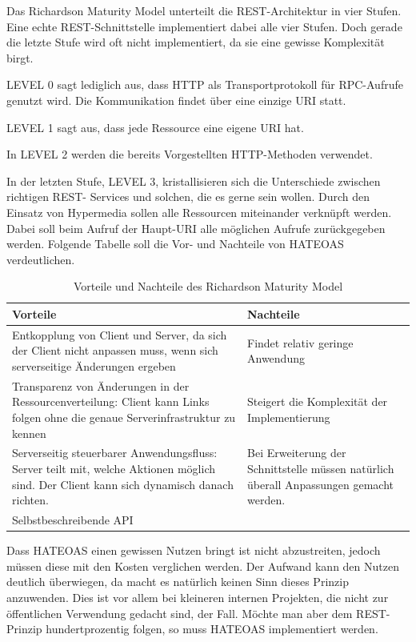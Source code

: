 Das Richardson Maturity Model unterteilt die \ac{REST}-Architektur in vier Stufen. Eine echte
\ac{REST}-Schnittstelle implementiert dabei alle vier Stufen. Doch gerade die letzte Stufe wird oft
nicht implementiert, da sie eine gewisse Komplexität birgt.

LEVEL 0 sagt lediglich aus, dass \ac{HTTP} als Transportprotokoll für RPC-Aufrufe genutzt wird.
Die Kommunikation findet über eine einzige \ac{URI} statt.

LEVEL 1 sagt aus, dass jede Ressource eine eigene \ac{URI} hat.

In LEVEL 2 werden die bereits Vorgestellten \ac{HTTP}-Methoden verwendet.

In der letzten Stufe, LEVEL 3, kristallisieren sich die Unterschiede zwischen richtigen \ac{REST}-
Services und solchen, die es gerne sein wollen. Durch den Einsatz von Hypermedia sollen alle
Ressourcen miteinander verknüpft werden. Dabei soll beim Aufruf der Haupt-\ac{URI} alle
möglichen Aufrufe zurückgegeben werden. Folgende Tabelle soll die Vor- und Nachteile von
HATEOAS verdeutlichen.
\newline

\begin{table}[H]
	\begin{tabular}{ | p{7cm} | p{7cm} | }	
		\hline	
		Vorteile & Nachteile \\  \hline	
		Entkopplung von Client und Server, da sich der Client nicht anpassen muss,
		wenn sich serverseitige Änderungen ergeben & 
		Findet relativ geringe Anwendung	 \\ \hline
		Transparenz von Änderungen in der Ressourcenverteilung: 
		Client kann Links folgen ohne die genaue Serverinfrastruktur zu kennen 
		& Steigert die Komplexität der Implementierung \\ \hline
		Serverseitig steuerbarer Anwendungsfluss: Server teilt mit, welche Aktionen möglich sind. 
		Der Client kann sich dynamisch danach richten.
		 & Bei Erweiterung der Schnittstelle müssen natürlich überall Anpassungen gemacht werden. \\ \hline
		Selbstbeschreibende API &  \\ \hline
	\end{tabular}
	\caption{Vorteile und Nachteile des Richardson Maturity Model}
\end{table}

Dass HATEOAS einen gewissen Nutzen bringt ist nicht abzustreiten, jedoch müssen diese mit den Kosten verglichen werden. Der Aufwand kann den Nutzen deutlich überwiegen, da macht es natürlich keinen Sinn dieses Prinzip anzuwenden. Dies ist vor allem bei kleineren internen Projekten, die nicht zur öffentlichen Verwendung gedacht sind, der Fall. Möchte man aber dem \ac{REST}-Prinzip hundertprozentig folgen, so muss HATEOAS implementiert werden.
